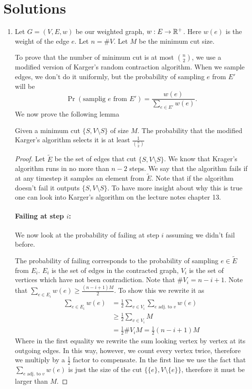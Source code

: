 \documentclass[11pt]{article}
\begin{document}
\section*{Solutions}
\begin{enumerate}
    \item Let $G=(V,E,w)$ be our weighted graph, $w:E\to \mathbb{R}^+$. Here $w(e)$ is the weight of the edge $e$. Let $n = \#V$. Let $M$ be the minimum cut size. 
    
    To prove that the number of minimum cut is at most $\binom{n}{2}$, we use a modified version of Karger's random contraction algorithm. When we sample edges, we don't do it uniformly, but the probability of sampling $e$ from $E'$ will be 
    \begin{equation*}
        \Pr(\text{samplig }e \text{ from }E') = \frac{w(e)}{\sum_{e\in E'}w(e)}.
    \end{equation*}
    We now prove the following lemma
    \begin{lemma}\label{l1} Given a minimum cut $\{S,V\setminus S\}$ of size $M$. The probability that the modified Karger's algorithm selects it is at least $\frac{1}{\binom{n}{2}}$
    \end{lemma}
    \begin{proof}
        Let $\tilde E$ be the set of edges that cut $\{S,V\setminus S\}$. We know that Krager's algorithm runs in no more than $n-2$ steps. We say that the algorithm fails if at any timestep it samples an element from $\tilde E$. Note that if the algorithm doesn't fail it outputs $\{S,V\setminus S\}$. To have more insight about why this is true one can look into Karger's algorithm on the lecture notes chapter 13.

        \paragraph*{Failing at step $i$:} We now look at the probability of failing at step $i$ assuming we didn't fail before.

        The probability of failing corresponds to the probability of sampling $e\in \tilde E$ from $E_i$. $E_i$ is the set of edges in the contracted graph, $V_i$ is the set of vertices which have not been contradiction. Note that $\# V_i = n - i + 1$. Note that $\sum_{e \in E_i}w(e)\geq \frac{(n-i+1)M}{2}$. To show this we rewrite it as
        \begin{align*}
            \sum_{e \in E_i}w(e) &= \frac{1}{2} \sum_{v \in V_i}\sum_{e \text{ adj. to }v} w(e) \\
            & \geq  \frac{1}{2}\sum_{v \in V_i}M \\
            & = \frac{1}{2}\#V_i M = \frac{1}{2}(n-i+1)M
        \end{align*}
        Where in the first equality we rewrite the sum looking vertex by vertex at its outgoing edges. In this way, however, we count every vertex twice, therefore we multiply by a $\frac{1}{2}$ factor to compensate. In the first line we use the fact that $\sum_{e \text{ adj. to }v} w(e)$ is just the size of the cut $\{\{e\},V\setminus \{e\}\}$, therefore it must be larger than $M$.


\end{proof}
\end{enumerate}
\end{document}
